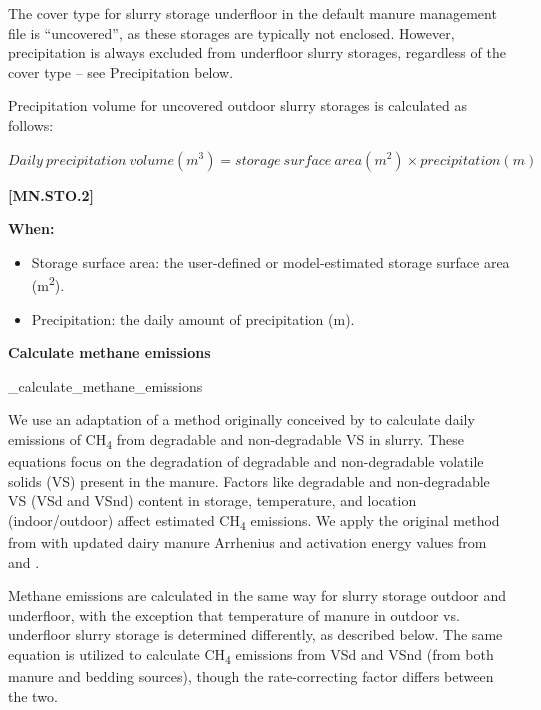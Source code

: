 \begin{refsection}
The cover type for slurry storage underfloor in the default manure management file is “uncovered”, as these storages are typically not enclosed. However, precipitation is always excluded from underfloor slurry storages, regardless of the cover type – see Precipitation below.

Precipitation volume for uncovered outdoor slurry storages is calculated as follows:
\vspace{0.5cm}

    \begin{center}
        \(Daily\ precipitation\ volume (m^3) = storage\ surface\ area (m^2) \times precipitation (m)\)
    \end{center}
        \vspace{0.5cm} 
    
            {\raggedleft \textbf{[MN.STO.2]}\par}
            \vspace{0.5cm}

    \textbf{When:}
    \begin{itemize}
        \item Storage surface area: the user-defined or model-estimated storage surface area (m\textsuperscript{2}). 
        \item Precipitation: the daily amount of precipitation (m).

    \end{itemize}
    \vspace{0.5cm}

            
\textbf{Calculate methane emissions}
\vspace{0.15cm}

\_calculate\_methane\_emissions
\vspace{0.2cm}

We use an adaptation of a method originally conceived by \cite{Sommer2004} to calculate daily emissions of CH\textsubscript{4} from degradable and non-degradable VS in slurry. These equations focus on the degradation of degradable and non-degradable volatile solids (VS) present in the manure. Factors like degradable and non-degradable VS (VSd and VSnd) content in storage, temperature, and location (indoor/outdoor) affect estimated CH\textsubscript{4} emissions. We apply the original method from \cite{Sommer2004} with updated dairy manure Arrhenius and activation energy values from \cite{Elsgaard2016} and \cite{Petersen2024}.
\vspace{0.2cm}

Methane emissions are calculated in the same way for slurry storage outdoor and underfloor, with the exception that temperature of manure in outdoor vs. underfloor slurry storage is determined differently, as described below. The same equation is utilized to calculate CH\textsubscript{4} emissions from VSd and VSnd (from both manure and bedding sources), though the rate-correcting factor differs between the two.
\vspace{0.2cm}


\end{refsection}
